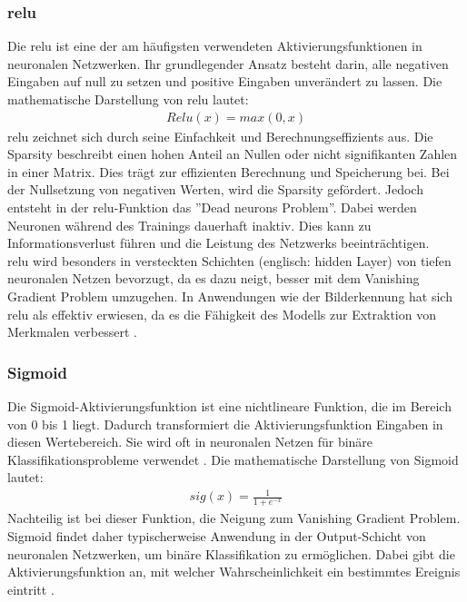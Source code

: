 \documentclass[12pt,a4paper]{article}
\begin{document}
		\subsubsection*{\ac{relu}}
			Die \ac{relu} ist eine der am häufigsten verwendeten Aktivierungsfunktionen in neuronalen Netzwerken. 
			Ihr grundlegender Ansatz besteht darin, alle negativen Eingaben auf null zu setzen und positive Eingaben unverändert zu lassen. 
			Die mathematische Darstellung von \ac{relu} lautet:
			\begin{align}
				Relu(x) = max(0,x)
			\end{align}
			\ac{relu} zeichnet sich durch seine Einfachkeit und Berechnungseffizients aus.
			Die Sparsity beschreibt einen hohen Anteil an Nullen oder nicht signifikanten Zahlen in einer Matrix. 
			Dies trägt zur effizienten Berechnung und Speicherung bei.
			Bei der Nullsetzung von negativen Werten, wird die Sparsity gefördert.
			Jedoch entsteht in der \ac{relu}-Funktion das ''Dead neurons Problem''. 
			Dabei werden Neuronen während des Trainings dauerhaft inaktiv. 
			Dies kann zu Informationsverlust führen und die Leistung des Netzwerks beeinträchtigen.\\
			\ac{relu} wird besonders in versteckten Schichten (englisch: hidden Layer) von tiefen neuronalen Netzen bevorzugt, da es dazu neigt, besser mit dem Vanishing Gradient Problem umzugehen. 
			In Anwendungen wie der Bilderkennung hat sich \ac{relu} als effektiv erwiesen, da es die Fähigkeit des Modells zur Extraktion von Merkmalen verbessert \cite[\ac{vgl}][]{9461312}.

		\subsubsection*{Sigmoid}
			Die Sigmoid-Aktivierungsfunktion ist eine nichtlineare Funktion, die im Bereich von 0 bis 1 liegt. 
			Dadurch transformiert die Aktivierungsfunktion Eingaben in diesen Wertebereich. 
			Sie wird oft in neuronalen Netzen für binäre Klassifikationsprobleme verwendet \cite[\ac{vgl}][]{9461312}.
			Die mathematische Darstellung von Sigmoid lautet:
			\begin{align}
				sig(x) = \frac{1}{1 + e^{-x}} 
			\end{align}
			Nachteilig ist bei dieser Funktion, die Neigung zum Vanishing Gradient Problem.
			Sigmoid findet daher typischerweise Anwendung in der Output-Schicht von neuronalen Netzwerken, um binäre Klassifikation zu ermöglichen. 
			Dabei gibt die Aktivierungsfunktion an, mit welcher Wahrscheinlichkeit ein bestimmtes Ereignis eintritt \cite[\ac{vgl}][]{site:machinelearningautomation}.
\end{document}
